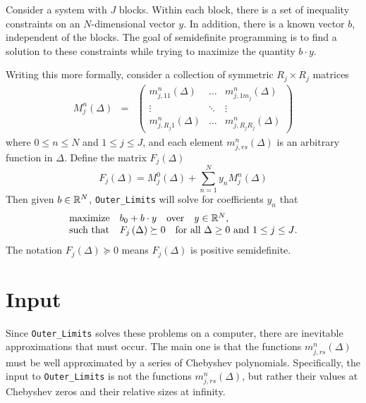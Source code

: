 \documentclass[12pt]{article}
\numberwithin{equation}{section}
\begin{document}
Consider a system with $J$ blocks.  Within each block, there is a set
of inequality constraints on an $N$-dimensional vector $y$.  In
addition, there is a known vector $b$, independent of the blocks.  The
goal of semidefinite programming is to find a solution to these
constraints while trying to maximize the quantity $b\cdot y$.

Writing this more formally, consider a collection of symmetric $R_{j}\times R_{j}$ matrices
\begin{eqnarray}
\label{eq:sdp}
M_j^n(\Delta) &=& \begin{pmatrix}
m_{j,11}^{n}(\Delta) & \dots & m_{j,1m_j}^{n}(\Delta)\\
\vdots & \ddots & \vdots\\
m_{j,R_j1}^{n}(\Delta) & \dots & m^{n}_{j,R_jR_j}(\Delta)
\end{pmatrix}
\end{eqnarray}
where $0 \leq n \leq N$ and $1 \leq j \leq J$, and each element
$m_{j,rs}^{n}(\Delta)$ is an arbitrary function in $\Delta$.  Define
the matrix $F_j\left(\Delta\right)$
\begin{equation}
F_j\left(\Delta\right)=M^0_j(\Delta)+\sum_{n=1}^{N} y_n M^n_j(\Delta)
\end{equation}
Then given $b\in \mathbb{R}^N$, \texttt{Outer\_Limits} will solve for coefficients $y_n$
that
\begin{eqnarray}
\label{eq:SDPconstraints}
\begin{array}{ll}
\textrm{maximize} & b_0+b\cdot y\quad\textrm{over}\quad y \in \mathbb{R}^N,\\
\textrm{such that} & F_j\left(\Delta\right) \succeq 0 \quad \textrm{for all $\Delta\geq 0$ and $1 \leq j \leq J$}.
\end{array}
\end{eqnarray}
The notation $F_j\left(\Delta\right)\succeq 0$ means $F_j\left(\Delta\right)$ is positive semidefinite.

\section{Input}
\label{sec:input}

Since \texttt{Outer\_Limits} solves these problems on a computer,
there are inevitable approximations that must occur.  The main one is
that the functions $m_{j,rs}^{n}(\Delta)$ must be well approximated by
a series of Chebyshev polynomials.  Specifically, the input to
\texttt{Outer\_Limits} is not the functions $m_{j,rs}^{n}(\Delta)$,
but rather their values at Chebyshev zeros and their relative sizes at
infinity.
\end{document}
